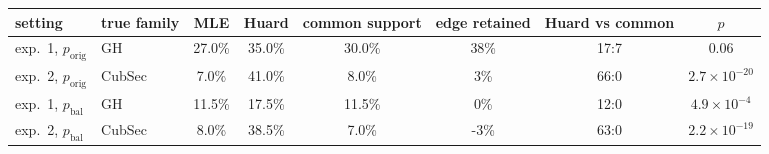 \begin{tabular}{llcccccc}
\toprule
setting & true family & MLE & Huard & common support & edge retained & Huard vs common & $p$ \\
\midrule
exp.~1, $p_{\text{orig}}$ & GH & 27.0\% & 35.0\% & 30.0\% & 38\% & 17:7 & $0.06$ \\
exp.~2, $p_{\text{orig}}$ & CubSec & 7.0\% & 41.0\% & 8.0\% & 3\% & 66:0 & $2.7\times10^{-20}$ \\
exp.~1, $p_{\text{bal}}$ & GH & 11.5\% & 17.5\% & 11.5\% & 0\% & 12:0 & $4.9\times10^{-4}$ \\
exp.~2, $p_{\text{bal}}$ & CubSec & 8.0\% & 38.5\% & 7.0\% & -3\% & 63:0 & $2.2\times10^{-19}$ \\
\bottomrule
\end{tabular}
